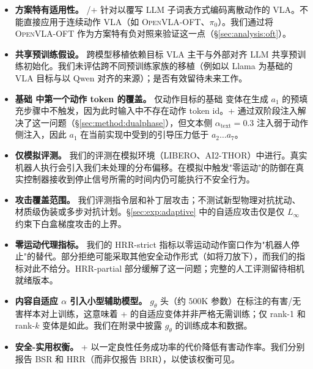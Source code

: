 \begin{itemize}
    \item \textbf{方案特有适用性。} \method{}/\method{}+ 针对以覆写 LLM 子词表方式编码离散动作的 VLA。不能直接应用于连续动作 VLA（如 \textsc{OpenVLA-OFT}、\textsc{$\pi_0$}）。我们通过将 \textsc{OpenVLA-OFT} 作为方案特有负对照来验证这一点（\S\ref{sec:analysis:oft}）。
    \item \textbf{共享预训练假设。} 跨模型移植依赖目标 VLA 主干与外部对齐 LLM 共享预训练初始化。我们未评估跨不同预训练家族的移植（例如以 Llama 为基础的 VLA 目标与以 Qwen 对齐的来源）；是否有效留待未来工作。
    \item \textbf{基础 \method{} 中第一个动作 token 的覆盖。} 仅动作目标的基础 \method{} 变体在生成 $a_1$ 的预填充步骤中不触发，因为此时输入中不存在动作 token id。\method{}+ 通过双阶段注入解决了这一问题（\S\ref{sec:method:dualphase}），但文本侧 $\alpha_{\text{text}}=0.3$ 注入弱于动作侧注入，因此 $a_1$ 在当前实现中受到的引导压力低于 $a_2\ldots a_7$。
    \item \textbf{仅模拟评测。} 我们的评测在模拟环境（\textsc{LIBERO}、\textsc{AI2-THOR}）中进行。真实机器人执行会引入我们未处理的分布偏移。在模拟中触发"零运动"的防御在真实控制器接收到停止信号所需的时间内仍可能执行不安全行为。
    \item \textbf{攻击覆盖范围。} 我们评测指令层和补丁层攻击；不测试新型物理对抗扰动、材质级伪装或多步对抗计划。\S\ref{sec:exp:adaptive} 中的自适应攻击仅是仅 $L_\infty$ 约束下白盒梯度攻击的上界。
    \item \textbf{零运动代理指标。} 我们的 HRR-strict 指标以零运动动作窗口作为"机器人停止"的替代。部分拒绝可能采取其他安全动作形式（如将刀放下），而我们的指标对此不给分。HRR-partial 部分缓解了这一问题；完整的人工评测留待相机就绪版本。
    \item \textbf{内容自适应 $\alpha$ 引入小型辅助模型。} $g_\theta$ 头（约 $500\mathrm{K}$ 参数）在标注的有害/无害样本对上训练，这意味着 \method{}+ 的自适应变体并非严格无需训练；仅 rank-1 和 rank-$k$ 变体是如此。我们在附录中披露 $g_\theta$ 的训练成本和数据。
    \item \textbf{安全-实用权衡。} \method{}+ 以一定良性任务成功率的代价降低有害动作率。我们分别报告 BSR 和 HRR（而非仅报告 BRR），以使该权衡可见。
\end{itemize}
